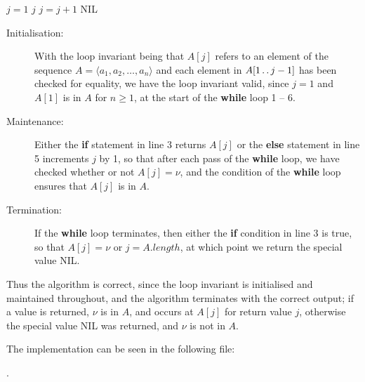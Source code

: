 
\begin{algorithmic}[1]
    \STATE $j = 1$
            \RETURN $j$
        \ELSE
            \STATE $j = j + 1$
        \ENDIF
    \ENDWHILE
    \RETURN \textrm{NIL}
\end{algorithmic}

\begin{description}
    \item[Initialisation:] With the loop invariant being that $A[j]$ refers to an 
        element of the sequence $A = \langle a_1, a_2, \ldots, a_n \rangle$ and 
        each element in $A[1\mathinner{{\ldotp}\,{\ldotp}} j - 1]$ has been checked for equality, we 
        have the loop invariant valid, since $j = 1$ and $A[1]$ is in $A$ for 
        $n \ge 1$, at the start of the \textbf{while} loop 1 -- 6.
    \item[Maintenance:] Either the \textbf{if} statement in line 3 returns $A[j]$
        or the \textbf{else} statement in line 5 increments $j$ by 1, so that after
        each pass of the \textbf{while} loop, we have checked whether or not 
        $A[j] = \nu$, and the condition of the \textbf{while} loop ensures that 
        $A[j]$ is in $A$.
    \item[Termination:] If the \textbf{while} loop terminates, then either the 
        \textbf{if} condition in line 3 is true, so that $A[j] = \nu$ or 
        $j = A.\mathit{length}$, at which point we return the special value
        \textrm{NIL}.
\end{description}

Thus the algorithm is correct, since the loop invariant is initialised and 
maintained throughout, and the algorithm terminates with the correct output;
if a value is returned, $\nu$ is in $A$, and occurs at $A[j]$ for return value
$j$, otherwise the special value \textrm{NIL} was returned, and $\nu$ is not in $A$.

The implementation can be seen in the following file:

.
